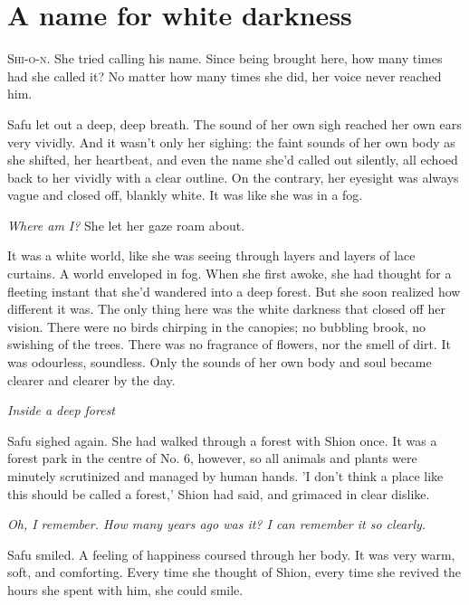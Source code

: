 
\chapter{A name for white darkness}


\lettrine{S}{hi-o-n}. She tried calling his name. Since being brought here, how many
times had she called it? No matter how many times she did, her voice
never reached him.

Safu let out a deep, deep breath. The sound of her own sigh reached her
own ears very vividly. And it wasn't only her sighing: the faint sounds
of her own body as she shifted, her heartbeat, and even the name she'd
called out silently, all echoed back to her vividly with a clear
outline. On the contrary, her eyesight was always vague and closed off,
blankly white. It was like she was in a fog.

\emph{Where am I?} She let her gaze roam about.

It was a white world, like she was seeing through layers and layers of
lace curtains. A world enveloped in fog. When she first awoke, she had
thought for a fleeting instant that she'd wandered into a deep forest.
But she soon realized how different it was. The only thing here was the
white darkness that closed off her vision. There were no birds chirping
in the canopies; no bubbling brook, no swishing of the trees. There was
no fragrance of flowers, nor the smell of dirt. It was odourless,
soundless. Only the sounds of her own body and soul became clearer and
clearer by the day.

\emph{Inside a deep forest\el }

Safu sighed again. She had walked through a forest with Shion once. It
was a forest park in the centre of No. 6, however, so all animals and
plants were minutely scrutinized and managed by human hands. 'I don't
think a place like this should be called a forest,' Shion had said, and
grimaced in clear dislike.

\emph{Oh, I remember. How many years ago was it? I can remember it so clearly.}

Safu smiled. A feeling of happiness coursed through her body. It was
very warm, soft, and comforting. Every time she thought of Shion, every
time she revived the hours she spent with him, she could smile.

